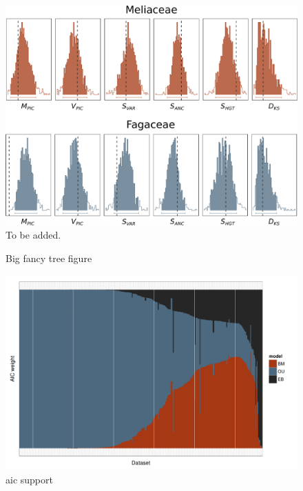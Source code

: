 \documentclass[a4paper,12pt]{article}
\begin{document}
\begin{figure}[p]
  \centering
  \includegraphics[scale=0.65]{figs/two-clade-example}
  \caption{To be added.}
  \label{fig:two-clades}
\end{figure}

\begin{figure}[p]
  \centering
  \caption{Big fancy tree figure}
  \label{fig:angio-phylogeny}
\end{figure}

\begin{figure}[p]
  \centering
  \includegraphics[scale=0.7]{figs/AIC-support}
  \caption{aic support}
  \label{fig:aic-support}
\end{figure}
\end{document}
